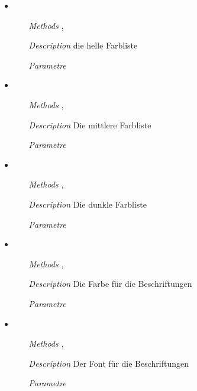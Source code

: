 \begin{itemize}
\item {}
\begin{enumerate}
\item[\textit{Methods}] ,
\item[\textit{Description}] die helle Farbliste
\item[\textit{Parametre}] 
\end{enumerate}

\item {}
\begin{enumerate}
\item[\textit{Methods}] ,
\item[\textit{Description}] Die mittlere Farbliste
\item[\textit{Parametre}] 
\end{enumerate}

\item {}
\begin{enumerate}
\item[\textit{Methods}] ,
\item[\textit{Description}] Die dunkle Farbliste
\item[\textit{Parametre}] 
\end{enumerate}

\item {}
\begin{enumerate}
\item[\textit{Methods}] , 
\item[\textit{Description}] Die Farbe f\"ur die Beschriftungen
\item[\textit{Parametre}] 
\end{enumerate}

\item {}
\begin{enumerate}
\item[\textit{Methods}] , 
\item[\textit{Description}] Der Font f\"ur die Beschriftungen
\item[\textit{Parametre}] 
\end{enumerate}


\end{itemize}
